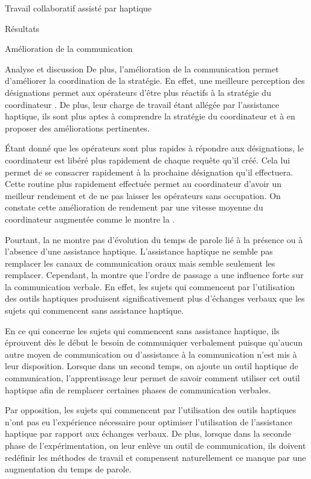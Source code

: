 \documentclass[myfrancais,ngerman,english,frenchb]{mythesis}
\begin{document}
\begin{mychapter}{Travail collaboratif assisté par haptique}
\begin{mysection}{Résultats}
\begin{mysubsection}{Amélioration de la communication}
\begin{mysubsubsection}{Analyse et discussion}
					De plus, l'amélioration de la communication permet d'améliorer la coordination de la stratégie.
					En effet, une meilleure perception des désignations permet aux opérateurs d'être plus réactifs à la stratégie du coordinateur .
					De plus, leur charge de travail étant allégée par l'assistance haptique, ils sont plus aptes à comprendre la stratégie du coordinateur et à en proposer des améliorations pertinentes.

					Étant donné que les opérateurs sont plus rapides à répondre aux désignations, le coordinateur est libéré plus rapidement de chaque requête qu'il créé.
					Cela lui permet de se consacrer rapidement à la prochaine désignation qu'il effectuera.
					Cette routine plus rapidement effectuée permet au coordinateur d'avoir un meilleur rendement et de ne pas laisser les opérateurs sans occupation.
					On constate cette amélioration de rendement par une vitesse moyenne du coordinateur augmentée comme le montre la .

					Pourtant, la  ne montre pas d'évolution du temps de parole lié à la présence ou à l'absence d'une assistance haptique.
					L'assistance haptique ne semble pas remplacer les canaux de communication oraux mais semble seulement les remplacer.
					Cependant, la  montre que l'ordre de passage a une influence forte sur la communication verbale.
					En effet, les sujets qui commencent par l'utilisation des outils haptiques produisent significativement plus d'échanges verbaux que les sujets qui commencent sans assistance haptique.

					En ce qui concerne les sujets qui commencent sans assistance haptique, ils éprouvent dès le début le besoin de communiquer verbalement puisque qu'aucun autre moyen de communication ou d'assistance à la communication n'est mis à leur disposition.
					Lorsque dans un second temps, on ajoute un outil haptique de communication, l'apprentissage leur permet de savoir comment utiliser cet outil haptique afin de remplacer certaines phases de communication verbales.

					Par opposition, les sujets qui commencent par l'utilisation des outils haptiques n'ont pas eu l'expérience nécessaire pour optimiser l'utilisation de l'assistance haptique par rapport aux échanges verbaux.
					De plus, lorsque dans la seconde phase de l'expérimentation, on leur enlève un outil de communication, ils doivent redéfinir les méthodes de travail et compensent naturellement ce manque par une augmentation du temps de parole.


\end{mysubsubsection}
\end{mysubsection}
\end{mysection}
\end{mychapter}
\end{document}
